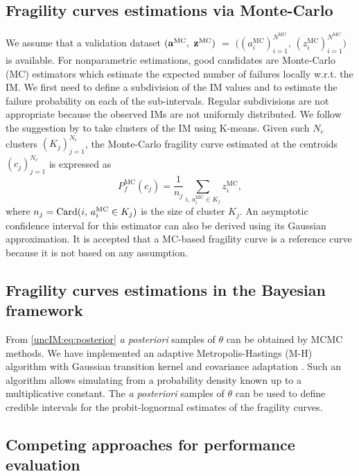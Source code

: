     \subsection{Fragility curves estimations via Monte-Carlo}
     \label{uncIM:sec:reference}
        We assume that a validation dataset $(\mathbf{a}^{\mathrm{MC}},$ $\mathbf{z}^{\mathrm{MC}})$ $ =$ $ ( (a_i^{\mathrm{MC}})_{i=1}^{N^{\mathrm{MC}}} $, $(z_i^{\mathrm{MC}})_{i=1}^{N^{\mathrm{MC}}})$ is available. For nonparametric estimations, good candidates are Monte-Carlo (MC) estimators which estimate the expected number of failures locally w.r.t. the IM. We first need to define a subdivision of the IM values and to estimate the failure probability on each of the sub-intervals. Regular subdivisions are not appropriate because the observed IMs are not uniformly distributed. We follow the suggestion by \citet{trevlopoulos_parametric_2019} to take clusters of the IM using K-means. 
        Given such $N_c$ clusters $(K_j)_{j=1}^{N_c}$, the Monte-Carlo fragility curve estimated at the centroids $(c_j)_{j=1}^{N_c}$ is expressed as
            \begin{equation} \label{uncIM:eq:refMC}
                P_f^{\mathrm{MC}}(c_j) = \frac{1}{n_j}\sum_{i,\,a_i^{\mathrm{MC}}\in K_j}z_i^{\mathrm{MC}}  , 
            \end{equation}
        where $n_j = {\rm Card}(i,\,a_i^{\mathrm{MC}}\in K_j)$ is the size of cluster $K_j$.
        An asymptotic confidence interval for this estimator can also be derived using its Gaussian approximation. It is accepted that a MC-based fragility curve is a reference curve because it is not based on any assumption.

    \subsection{Fragility curves estimations in the Bayesian framework}  \label{uncIM:sec:BayesFram}
        From \cref{uncIM:eq:posterior} \emph{a posteriori} samples of $\theta$ can be obtained by MCMC methods. We have implemented an adaptive Metropolis-Hastings (M-H) algorithm with Gaussian transition kernel and covariance adaptation \citep{haario_adaptive_2001}. Such an algorithm allows simulating from a probability density known up to a multiplicative constant. The \emph{a posteriori} samples of $\theta$ can be used to define credible intervals for the probit-lognormal estimates of the fragility curves.

    \subsection{Competing approaches for performance evaluation} \label{uncIM:sec:Competing}
    
